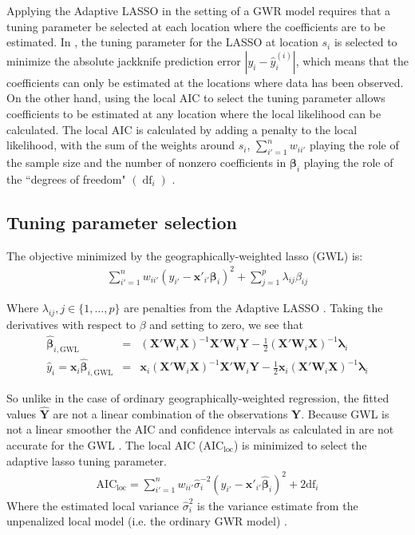 \documentclass[authoryear, review, 11pt]{elsarticle}
\DeclareMathOperator*{\df}{\mbox{df}}
\begin{document}
	Applying the Adaptive LASSO in the setting of a GWR model requires that a tuning parameter be selected at each location where the coefficients are to be estimated. In \cite{Wheeler:2009}, the tuning parameter for the LASSO at location $s_i$ is selected to minimize the absolute jackknife prediction error $|y_i - \hat{y}_i^{(i)}|$, which means that the coefficients can only be estimated at the locations where data has been observed. On the other hand, using the local AIC to select the tuning parameter allows coefficients to be estimated at any location where the local likelihood can be calculated. The local AIC is calculated by adding a penalty to the local likelihood, with the sum of the weights around $s_i$, $\sum_{i'=1}^n w_{ii'}$ playing the role of the sample size and the number of nonzero coefficients in $\bm{\beta}_i$ playing the role of the ``degrees of freedom" $\left( \df_i \right)$ \citep{Zou:2007}.\\

	\subsection{Tuning parameter selection}
	The objective minimized by the geographically-weighted lasso (GWL) is:	
	\begin{eqnarray}
		\sum_{i'=1}^n w_{ii'} \left(y_{i'} - \bm{x}'_{i'} \bm{\beta}_i \right)^2 + \sum_{j=1}^p \lambda_{ij} \beta_{ij}
	\end{eqnarray}
	
	Where $\lambda_{ij}, j \in \{1, \dots, p\}$ are penalties from the Adaptive LASSO \citep{Zou:2006}. Taking the derivatives with respect to $\beta$ and setting to zero, we see that
	\begin{eqnarray}
		\hat{\bm{\beta}}_{i, \mbox{GWL}} &=& \left( \bm{X}'\bm{W}_i\bm{X} \right)^{-1}  \bm{X}'\bm{W}_i\bm{Y}  - \frac{1}{2} \left(\bm{X}'\bm{W}_i\bm{X} \right)^{-1} \bm{\lambda}_i\\
		\hat{y}_i = \bm{x}_i \hat{\bm{\beta}}_{i, \mbox{GWL}} &=&  \bm{x}_i \left( \bm{X}'\bm{W}_i\bm{X} \right)^{-1}  \bm{X}'\bm{W}_i\bm{Y}  - \frac{1}{2} \bm{x}_i \left(\bm{X}'\bm{W}_i\bm{X} \right)^{-1} \bm{\lambda}_i
	\end{eqnarray}
	
	So unlike in the case of ordinary geographically-weighted regression, the fitted values $\hat{\bm{Y}}$ are not a linear combination of the observations $\bm{Y}$. Because GWL is not a linear smoother the AIC and confidence intervals as calculated in \cite{Fotheringham:2002} are not accurate for the GWL \citep{Zou:2006}. The local AIC ($\mbox{AIC}_{\mbox{loc}}$) is minimized to select the adaptive lasso tuning parameter.
	\begin{eqnarray}
		\mbox{AIC}_{\mbox{loc}} = \sum_{i'=1}^n w_{ii'} \hat{\sigma}_i^{-2} \left( y_{i'} - \bm{x}'_{i'} \hat{\bm{\beta}}_i \right)^2 + 2 \mbox{df}_i
	\end{eqnarray}	
	Where the estimated local variance $\hat{\sigma}_i^2$ is the variance estimate from the unpenalized local model (i.e. the ordinary GWR model) \citep{Zou:2007}.\\
	 
\end{document}
